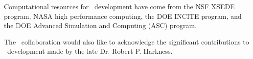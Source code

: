 Computational resources for \enzo\ development have come from the NSF
XSEDE program, NASA high performance computing, the DOE INCITE
program, and the DOE Advanced Simulation and Computing (ASC) program.

The \enzo\ collaboration would also like to acknowledge the significant contributions to
\enzo\ development made by the late Dr. Robert P. Harkness. 

